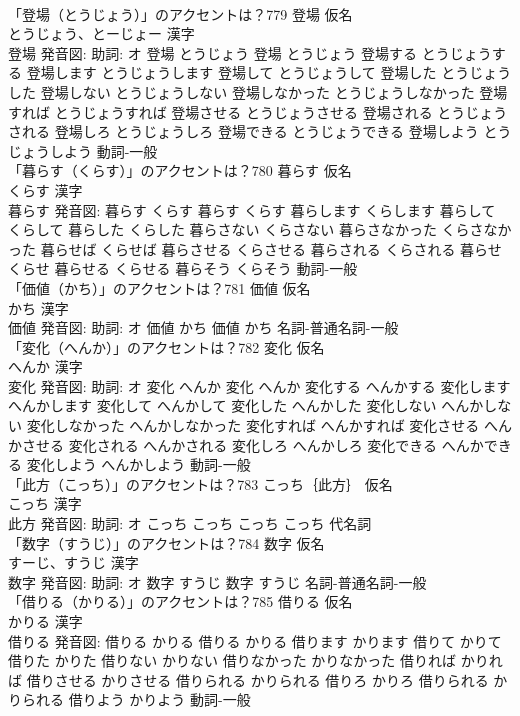 \documentclass[8pt]{extreport}
\begin{document}
\begin{CJK}{UTF8}{min}
\\	「登場（とうじょう）」のアクセントは？779	登場 仮名　
\\	とうじょう、とーじょー 漢字　
\\	登場 発音図: 助詞: オ	登場 とうじょう		登場 とうじょう 登場する とうじょうする 登場します とうじょうします 登場して とうじょうして 登場した とうじょうした 登場しない とうじょうしない 登場しなかった とうじょうしなかった 登場すれば とうじょうすれば 登場させる とうじょうさせる 登場される とうじょうされる 登場しろ とうじょうしろ 登場できる とうじょうできる 登場しよう とうじょうしよう				動詞-一般 
\\	「暮らす（くらす）」のアクセントは？780	暮らす 仮名　
\\	くらす 漢字　
\\	暮らす 発音図:	暮らす くらす		暮らす くらす 暮らします くらします 暮らして くらして 暮らした くらした 暮らさない くらさない 暮らさなかった くらさなかった 暮らせば くらせば 暮らさせる くらさせる 暮らされる くらされる 暮らせ くらせ 暮らせる くらせる 暮らそう くらそう				動詞-一般 
\\	「価値（かち）」のアクセントは？781	価値 仮名　
\\	かち 漢字　
\\	価値 発音図: 助詞: オ	価値 かち		価値 かち				名詞-普通名詞-一般 
\\	「変化（へんか）」のアクセントは？782	変化 仮名　
\\	へんか 漢字　
\\	変化 発音図: 助詞: オ	変化 へんか		変化 へんか 変化する へんかする 変化します へんかします 変化して へんかして 変化した へんかした 変化しない へんかしない 変化しなかった へんかしなかった 変化すれば へんかすれば 変化させる へんかさせる 変化される へんかされる 変化しろ へんかしろ 変化できる へんかできる 変化しよう へんかしよう				動詞-一般 
\\	「此方（こっち）」のアクセントは？783	こっち｛此方｝ 仮名　
\\	こっち 漢字　
\\	此方 発音図: 助詞: オ	こっち こっち		こっち こっち				代名詞 
\\	「数字（すうじ）」のアクセントは？784	数字 仮名　
\\	すーじ、すうじ 漢字　
\\	数字 発音図: 助詞: オ	数字 すうじ		数字 すうじ				名詞-普通名詞-一般 
\\	「借りる（かりる）」のアクセントは？785	借りる 仮名　
\\	かりる 漢字　
\\	借りる 発音図:	借りる かりる		借りる かりる 借ります かります 借りて かりて 借りた かりた 借りない かりない 借りなかった かりなかった 借りれば かりれば 借りさせる かりさせる 借りられる かりられる 借りろ かりろ 借りられる かりられる 借りよう かりよう				動詞-一般 

\end{CJK}
\end{document}
